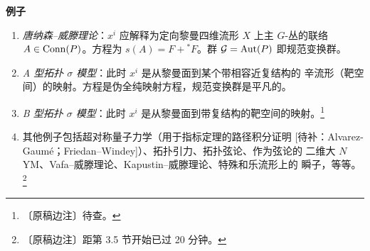 \textbf{例子}

\begin{enumerate}
\item \emph{唐纳森--威滕理论}：$x^i$ 应解释为定向黎曼四维流形 $X$ 上主
  $G$-丛的联络 $A\in\operatorname{Conn}(P)$。方程为 $s(A)=F+{}^{\ast}F$。群
  $\mathcal G=\operatorname{Aut}(P)$ 即规范变换群。
\item \emph{A 型拓扑 $\sigma$ 模型}：此时 $x^i$ 是从黎曼面到某个带相容近复结构的
  辛流形（靶空间）的映射。方程是伪全纯映射方程，规范变换群是平凡的。
\item \emph{B 型拓扑 $\sigma$ 模型}：此时 $x^i$ 是从黎曼面到带复结构的靶空间的映射。\footnote{〔原稿边注〕待查。}
\item 其他例子包括超对称量子力学（用于指标定理的路径积分证明
  [待补：Alvarez-Gaum\'e；Friedan--Windey]）、拓扑引力、拓扑弦论、作为弦论的
  二维大 $N$ YM、Vafa--威滕理论、Kapustin--威滕理论、特殊和乐流形上的
  瞬子，等等。\footnote{〔原稿边注〕距第 3.5 节开始已过 20 分钟。}
\end{enumerate}
